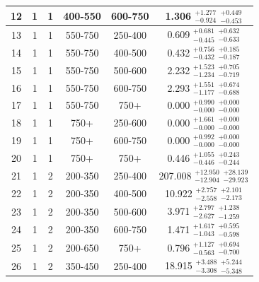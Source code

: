 \begin{table}[htbp]
\begin{centering}
\begin{tabular}{|c|c|c|c|c||c|}
\hline
12 &               1 &               1 &         400-550 &         600-750 & 1.306 $^{+1.277}_{-0.924}$ $^{+0.449}_{-0.453}$ \\ 
\hline
13 &               1 &               1 &         550-750 &         250-400 & 0.609 $^{+0.681}_{-0.445}$ $^{+0.632}_{-0.633}$ \\ 
\hline
14 &               1 &               1 &         550-750 &         400-500 & 0.432 $^{+0.756}_{-0.432}$ $^{+0.185}_{-0.187}$ \\ 
\hline
15 &               1 &               1 &         550-750 &         500-600 & 2.232 $^{+1.523}_{-1.234}$ $^{+0.705}_{-0.719}$ \\ 
\hline
16 &               1 &               1 &         550-750 &         600-750 & 2.293 $^{+1.551}_{-1.177}$ $^{+0.674}_{-0.688}$ \\ 
\hline
17 &               1 &               1 &         550-750 &            750+ & 0.000 $^{+0.990}_{-0.000}$ $^{+0.000}_{-0.000}$ \\ 
\hline
18 &               1 &               1 &            750+ &         250-600 & 0.000 $^{+1.661}_{-0.000}$ $^{+0.000}_{-0.000}$ \\ 
\hline
19 &               1 &               1 &            750+ &         600-750 & 0.000 $^{+0.992}_{-0.000}$ $^{+0.000}_{-0.000}$ \\ 
\hline
20 &               1 &               1 &            750+ &            750+ & 0.446 $^{+1.055}_{-0.446}$ $^{+0.243}_{-0.244}$ \\ 
\hline
21 &               1 &               2 &         200-350 &         250-400 & 207.008 $^{+12.950}_{-12.904}$ $^{+28.139}_{-29.923}$ \\ 
\hline
22 &               1 &               2 &         200-350 &         400-500 & 10.922 $^{+2.757}_{-2.558}$ $^{+2.101}_{-2.173}$ \\ 
\hline
23 &               1 &               2 &         200-350 &         500-600 & 3.971 $^{+2.797}_{-2.627}$ $^{+1.238}_{-1.259}$ \\ 
\hline
24 &               1 &               2 &         200-350 &         600-750 & 1.471 $^{+1.617}_{-1.043}$ $^{+0.595}_{-0.598}$ \\ 
\hline
25 &               1 &               2 &         200-650 &            750+ & 0.796 $^{+1.127}_{-0.563}$ $^{+0.694}_{-0.700}$ \\ 
\hline
26 &               1 &               2 &         350-450 &         250-400 & 18.915 $^{+3.488}_{-3.308}$ $^{+5.244}_{-5.348}$ \\ 

\end{tabular}
\end{centering}
\end{table}
